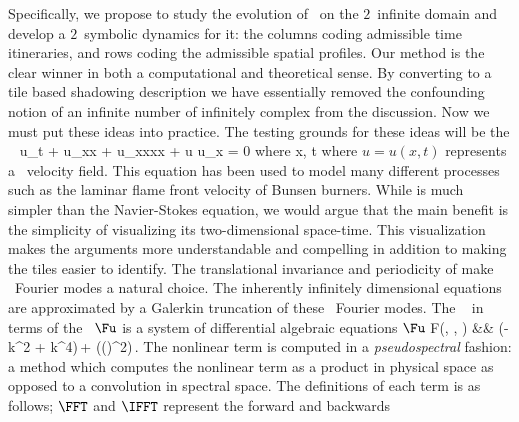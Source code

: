 Specifically, we propose to study the evolution of \KS\ on the $2$\dmn\
infinite {\spt}domain and develop a $2$\dmn\ symbolic dynamics for it:
the columns coding admissible time itineraries, and rows coding the
admissible spatial profiles. Our {\spt} method is the clear winner in
both a computational and theoretical sense. By converting to a tile based
shadowing description we have essentially removed the confounding notion
of an infinite number of infinitely complex {\twots} from the discussion.
Now we must put these ideas into practice.
The testing grounds for these ideas will be the \spt\ \KSe
\beq \label{e-ks}
u_t + u_{xx} + u_{xxxx} + u u_x = 0 \quad \mbox{where} \quad x\in[0,\speriod{}], t\in[0,\period{}]
\eeq
where $u = u(x, t)$ represents a \spt\ velocity field. This
equation has been used to model many different processes such as
the laminar flame front velocity of Bunsen burners.
While  is much simpler than the {\spt} Navier-Stokes equation,
we would argue that the main benefit is the simplicity of
visualizing its two-dimensional space-time. This visualization
makes the arguments more understandable and compelling in addition
to making the tiles easier to identify.
The translational invariance and periodicity of  make
\spt\ Fourier modes a natural choice.
The inherently infinitely dimensional equations are approximated
by a Galerkin truncation of these \spt\ Fourier modes.
The \KSe\  in terms of the \Fcs\ $\Fu$ is a
system of differential algebraic equations
$\Fu$
\bea \label{e-kssFb}
F(\Fu, \speriod{}, \period{}) &\equiv& (\omega - k^2 + k^4)\,\Fu +  \FFT(\IFFT(\Fu)^2)\,.
\eea
The nonlinear term is computed in a \emph{pseudospectral} fashion: a method which computes the
nonlinear term as a product in physical space as opposed to a convolution in spectral space.
The definitions of each term is as follows; $\FFT$ and $\IFFT$ represent the forward and backwards
